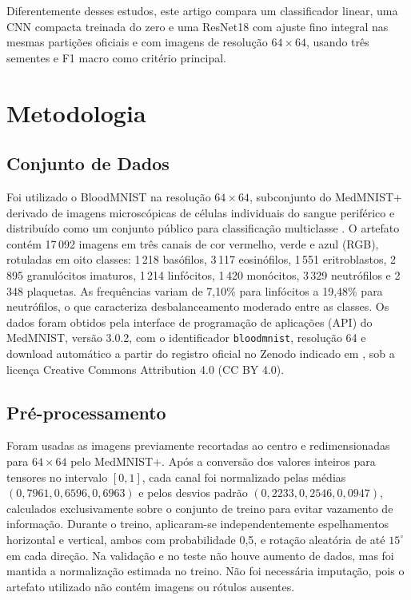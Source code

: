 \documentclass[conference]{IEEEtran}
\begin{document}
Diferentemente desses estudos, este artigo compara um classificador linear, uma CNN compacta treinada do zero e uma ResNet18 com ajuste fino integral nas mesmas partições oficiais e com imagens de resolução $64\times64$, usando três sementes e F1 macro como critério principal.

\section{Metodologia}
\label{sec:metodologia}

\subsection{Conjunto de Dados}
Foi utilizado o BloodMNIST na resolução $64\times64$, subconjunto do MedMNIST+ derivado de imagens microscópicas de células individuais do sangue periférico e distribuído como um conjunto público para classificação multiclasse \cite{acevedo2020dataset,yang2024medmnistdata}.
O artefato contém 17\,092 imagens em três canais de cor vermelho, verde e azul (RGB), rotuladas em oito classes: 1\,218 basófilos, 3\,117 eosinófilos, 1\,551 eritroblastos, 2\,895 granulócitos imaturos, 1\,214 linfócitos, 1\,420 monócitos, 3\,329 neutrófilos e 2\,348 plaquetas.
As frequências variam de 7,10\% para linfócitos a 19,48\% para neutrófilos, o que caracteriza desbalanceamento moderado entre as classes.
Os dados foram obtidos pela interface de programação de aplicações (API) do MedMNIST, versão 3.0.2, com o identificador \texttt{bloodmnist}, resolução 64 e download automático a partir do registro oficial no Zenodo indicado em \cite{yang2024medmnistdata}, sob a licença Creative Commons Attribution 4.0 (CC BY 4.0).

\subsection{Pré-processamento}
Foram usadas as imagens previamente recortadas ao centro e redimensionadas para $64\times64$ pelo MedMNIST+.
Após a conversão dos valores inteiros para tensores no intervalo $[0,1]$, cada canal foi normalizado pelas médias $(0{,}7961, 0{,}6596, 0{,}6963)$ e pelos desvios padrão $(0{,}2233, 0{,}2546, 0{,}0947)$, calculados exclusivamente sobre o conjunto de treino para evitar vazamento de informação.
Durante o treino, aplicaram-se independentemente espelhamentos horizontal e vertical, ambos com probabilidade 0,5, e rotação aleatória de até $15^\circ$ em cada direção.
Na validação e no teste não houve aumento de dados, mas foi mantida a normalização estimada no treino.
Não foi necessária imputação, pois o artefato utilizado não contém imagens ou rótulos ausentes.
\end{document}
